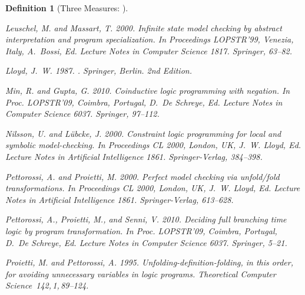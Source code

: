 \documentclass[english]{tlp}
\newtheorem{definition}{Definition} \newtheorem{example}{Example}       \newtheorem{remark}{Remark}
\begin{document}
\begin{definition}[Three Measures:   ]
{\begin{thebibliography}{}
{\sc Leuschel, M.} {\sc and} {\sc Massart, T.} 2000.
\newblock Infinite state model checking by abstract interpretation and program
  specialization.
\newblock In {\em Proceedings LOPSTR'99, Venezia, Italy},
  {A.~Bossi}, Ed. Lecture Notes in Computer Science 1817. Springer, 63--82.
  
{\sc Lloyd, J.~W.} 1987.
.
\newblock Springer, Berlin. 
\newblock 2nd Edition.

{\sc Min, R.} {\sc and} {\sc Gupta, G.} 2010.
\newblock Coinductive logic programming with negation.
\newblock In {\em Proc. LOPSTR'09,
  Coimbra, Portugal}, {D.~{De Schreye}}, Ed.  
  Lecture Notes in Computer Science 6037. Springer, 97--112.
  
  
{\sc Nilsson, U.} {\sc and} {\sc L{\"u}bcke, J.} 2000.
\newblock Constraint logic programming for local and symbolic model-checking.
\newblock In {\em Proceedings CL 2000, London, UK}, {J.~W. Lloyd}, Ed.
  Lecture Notes in Artificial Intelligence 1861. Springer-Verlag, 384--398.

{\sc Pettorossi, A.} {\sc and} {\sc Proietti, M.} 2000.
\newblock Perfect model checking via unfold/fold transformations.
\newblock In {\em Proceedings CL 2000, London, UK}, {J.~W. Lloyd}, Ed.
  Lecture Notes in Artificial Intelligence 1861. Springer-Verlag, 613--628.

{\sc Pettorossi, A.}, {\sc Proietti, M.}, {\sc and} {\sc Senni, V.} 2010.
\newblock Deciding full branching time logic by program transformation.
\newblock In {\em Proc. LOPSTR'09,
  Coimbra, Portugal}, {D.~{De Schreye}}, Ed. 
  Lecture Notes in Computer Science 6037. Springer, 5--21.

{\sc Proietti, M.} {\sc and} {\sc Pettorossi, A.} 1995.
\newblock Unfolding-definition-folding, in this order, for avoiding unnecessary
  variables in logic pro\-grams.
{\em Theoretical Computer Science\/}~{\em 142,\/}\,1,\,89--124.


\end{thebibliography}}
\end{definition}
\end{document}
